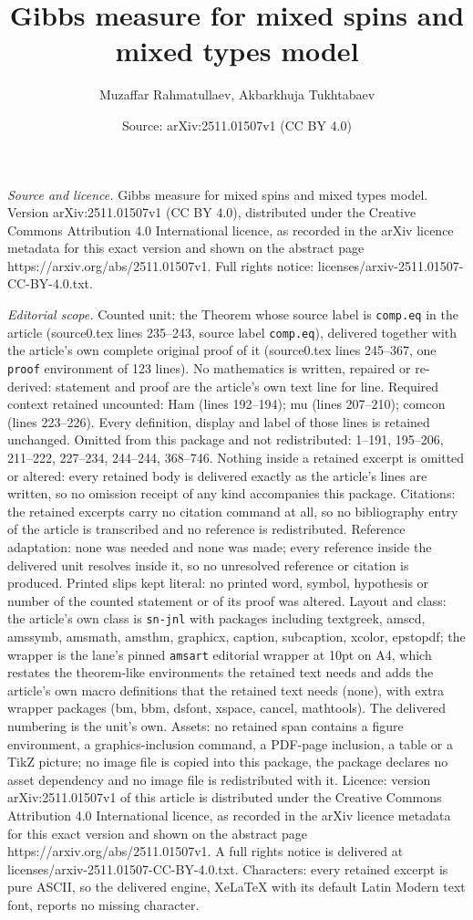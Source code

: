 \documentclass[10pt,a4paper]{amsart}
\title[Gibbs measure for mixed spins and mixed types model]{Gibbs measure for mixed spins and mixed types model}
\author{Muzaffar Rahmatullaev, Akbarkhuja Tukhtabaev}
\date{Source: arXiv:2511.01507v1 (CC BY 4.0)}
\begin{document}
\maketitle

\noindent\emph{Source and licence.} Gibbs measure for mixed spins and mixed types model. Version arXiv:2511.01507v1 (CC BY 4.0), distributed under the Creative Commons Attribution 4.0 International licence, as recorded in the arXiv licence metadata for this exact version and shown on the abstract page https://arxiv.org/abs/2511.01507v1. Full rights notice: licenses/arxiv-2511.01507-CC-BY-4.0.txt.\par\smallskip

\noindent\textit{Editorial scope.} Counted unit: the Theorem whose source label is \texttt{comp.eq} in the article (source0.tex lines 235--243, source label \texttt{comp.eq}), delivered together with the article's own complete original proof of it (source0.tex lines 245--367, one \texttt{proof} environment of 123 lines). No mathematics is written, repaired or re-derived: statement and proof are the article's own text line for line. Required context retained uncounted: Ham (lines 192--194); mu (lines 207--210); comcon (lines 223--226). Every definition, display and label of those lines is retained unchanged. Omitted from this package and not redistributed: 1--191, 195--206, 211--222, 227--234, 244--244, 368--746. Nothing inside a retained excerpt is omitted or altered: every retained body is delivered exactly as the article's lines are written, so no omission receipt of any kind accompanies this package. Citations: the retained excerpts carry no citation command at all, so no bibliography entry of the article is transcribed and no reference is redistributed. Reference adaptation: none was needed and none was made; every reference inside the delivered unit resolves inside it, so no unresolved reference or citation is produced. Printed slips kept literal: no printed word, symbol, hypothesis or number of the counted statement or of its proof was altered. Layout and class: the article's own class is \texttt{sn-jnl} with packages including textgreek, amscd, amssymb, amsmath, amsthm, graphicx, caption, subcaption, xcolor, epstopdf; the wrapper is the lane's pinned \texttt{amsart} editorial wrapper at 10pt on A4, which restates the theorem-like environments the retained text needs and adds the article's own macro definitions that the retained text needs (none), with extra wrapper packages (bm, bbm, dsfont, xspace, cancel, mathtools). The delivered numbering is the unit's own. Assets: no retained span contains a figure environment, a graphics-inclusion command, a PDF-page inclusion, a table or a TikZ picture; no image file is copied into this package, the package declares no asset dependency and no image file is redistributed with it. Licence: version arXiv:2511.01507v1 of this article is distributed under the Creative Commons Attribution 4.0 International licence, as recorded in the arXiv licence metadata for this exact version and shown on the abstract page https://arxiv.org/abs/2511.01507v1. A full rights notice is delivered at licenses/arxiv-2511.01507-CC-BY-4.0.txt. Characters: every retained excerpt is pure ASCII, so the delivered engine, XeLaTeX with its default Latin Modern text font, reports no missing character.
\end{document}
